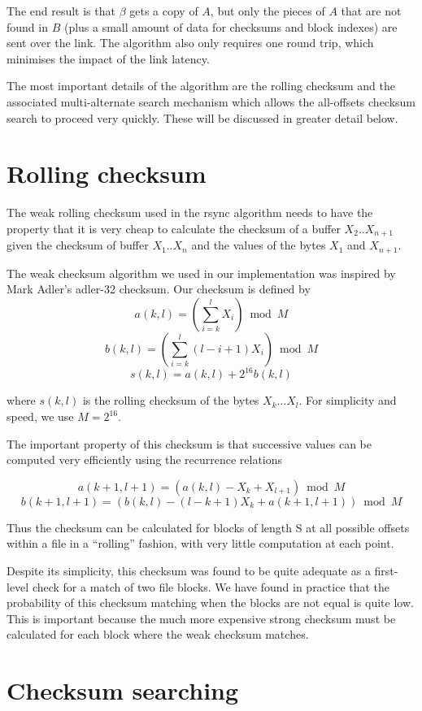 \documentclass[a4paper]{article}
\begin{document}
The end result is that $\beta$ gets a copy of $A$, but only the pieces
of $A$ that are not found in $B$ (plus a small amount of data for
checksums and block indexes) are sent over the link. The algorithm
also only requires one round trip, which minimises the impact of the
link latency.

The most important details of the algorithm are the rolling checksum
and the associated multi-alternate search mechanism which allows the
all-offsets checksum search to proceed very quickly. These will be
discussed in greater detail below.

\section{Rolling checksum}

The weak rolling checksum used in the rsync algorithm needs to have
the property that it is very cheap to calculate the checksum of a
buffer $X_2 .. X_{n+1}$ given the checksum of buffer $X_1 .. X_n$ and
the values of the bytes $X_1$ and $X_{n+1}$.

The weak checksum algorithm we used in our implementation was inspired
by Mark Adler's adler-32 checksum.  Our checksum is defined by
$$ a(k,l) = (\sum_{i=k}^l X_i) \bmod M $$
$$ b(k,l) = (\sum_{i=k}^l (l-i+1)X_i) \bmod M $$
$$ s(k,l) = a(k,l) + 2^{16} b(k,l) $$

where $s(k,l)$ is the rolling checksum of the bytes $X_k \ldots X_l$.
For simplicity and speed, we use $M = 2^{16}$.  

The important property of this checksum is that successive values can
be computed very efficiently using the recurrence relations

$$ a(k+1,l+1) = (a(k,l) - X_k + X_{l+1}) \bmod M $$
$$ b(k+1,l+1) = (b(k,l) - (l-k+1) X_k + a(k+1,l+1)) \bmod M $$

Thus the checksum can be calculated for blocks of length S at all
possible offsets within a file in a ``rolling'' fashion, with very
little computation at each point.

Despite its simplicity, this checksum was found to be quite adequate as
a first-level check for a match of two file blocks.  We have found in
practice that the probability of this checksum matching when the
blocks are not equal is quite low.  This is important because the much
more expensive strong checksum must be calculated for each block where
the weak checksum matches.

\section{Checksum searching}
\end{document}
